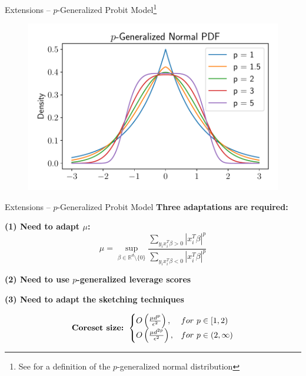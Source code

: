 \documentclass[gray]{beamer}
\begin{document}
\begin{frame}{Extensions -- $p$-Generalized Probit
        Model\footnote{See \cite{KalkeR13} for a definition of the $p$-generalized normal distribution}}
    \begin{figure}[ht!]
        \centering
        \includegraphics[width=\linewidth]{../figures/p_gen_pdf.pdf}
    \end{figure}
\end{frame}

\begin{frame}{Extensions -- $p$-Generalized Probit Model}
    \textbf{Three adaptations are required:}

    \vspace{\fill}

    \textbf{(1) Need to adapt $\mu$:}
    \begin{equation*}
        \mu = \sup_{\beta \in \mathbb{R}^d \setminus \{0\} }
        \frac{\sum_{y_ix_i^T\beta > 0} |x_i^T \beta|^p}
        {\sum_{y_ix_i^T\beta < 0}|x_i^T \beta|^p}
    \end{equation*}

    \pause

    \vspace{\fill}

    \textbf{(2) Need to use $p$-generalized leverage scores}

    \pause

    \vspace{\fill}

    \textbf{(3) Need to adapt the sketching techniques}

    \pause

    \vspace{\fill}

    \begin{equation*}
        \text{\textbf{Coreset size:} } \begin{cases}
            O\left(\frac{\mu d^p}{\epsilon^2}\right),    & for\ p \in [1, 2)      \\
            O\left(\frac{\mu d^{2p}}{\epsilon^2}\right), & for\ p \in (2, \infty)
        \end{cases}
    \end{equation*}
\end{frame}
\end{document}
